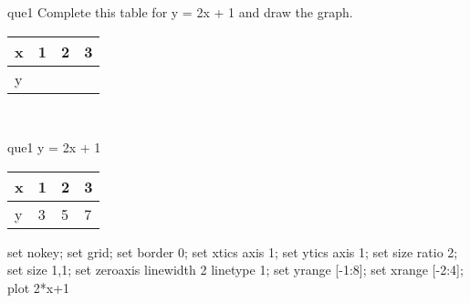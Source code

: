 \documentclass[13.5pt, varwidth=true]{beamer}
\begin{document}
\begin{frame}[shrink=19,fragile]
	\begin{beamercolorbox}[rounded=true, left, shadow=true,wd=14.8cm]{que1}
		 Complete this table for y = 2x + 1 and draw the graph. \\[0.3cm] \renewcommand{\arraystretch}{1.2}\begin{tabular}{|C|C|C|C|} \hline x & 1 & 2 & 3 \\ \hline y & & & \\ \hline \end{tabular}\\[0.3cm]
	\end{beamercolorbox}
\end{frame}
\begin{frame}[shrink=19,fragile]
	\begin{beamercolorbox}[rounded=true, left, shadow=true,wd=14.8cm]{que1}
		y = 2x + 1\renewcommand{\arraystretch}{1.2}\begin{tabular}{|C|C|C|C|} \hline x & 1 & 2 & 3 \\ \hline y & 3 & 5 & 7\\ \hline \end{tabular}\begin{gnuplot}[terminal=pdf] set nokey; set grid; set border 0; set xtics axis 1; set ytics axis 1; set size ratio 2; set size 1,1; set zeroaxis linewidth 2 linetype 1; set yrange [-1:8]; set xrange [-2:4]; plot 2*x+1 \end{gnuplot}
	\end{beamercolorbox}
\end{frame}
\end{document}
